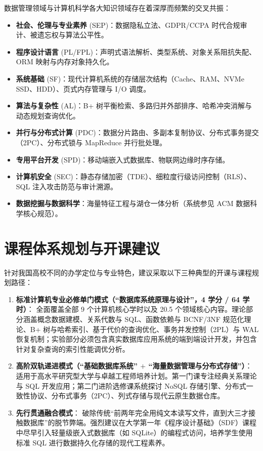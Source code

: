 数据管理领域与计算机科学各大知识领域存在着深厚而频繁的交叉共振：
\begin{itemize}
    \item \textbf{社会、伦理与专业素养} (SEP)：数据隐私立法、GDPR/CCPA 时代合规审计、被遗忘权与算法公平性。
    \item \textbf{程序设计语言} (PL/FPL)：声明式语法解析、类型系统、对象关系阻抗失配、ORM 映射与内存对象持久化。
    \item \textbf{系统基础} (SF)：现代计算机系统的存储层次结构（Cache、RAM、NVMe SSD、HDD）、页式内存管理与 I/O 调度。
    \item \textbf{算法与复杂性} (AL)：B+ 树平衡检索、多路归并外部排序、哈希冲突消解与动态规划查询优化。
    \item \textbf{并行与分布式计算} (PDC)：数据分片路由、多副本复制协议、分布式事务提交（2PC）、分布式锁与 MapReduce 并行批处理。
    \item \textbf{专用平台开发} (SPD)：移动端嵌入式数据库、物联网边缘时序存储。
    \item \textbf{计算机安全} (SEC)：静态存储加密（TDE）、细粒度行级访问控制（RLS）、SQL 注入攻击防范与审计溯源。
    \item \textbf{数据挖掘与数据科学}：海量特征工程与湖仓一体分析（系统参见 ACM 数据科学核心规范）。
\end{itemize}

\section{课程体系规划与开课建议}

针对我国高校不同的办学定位与专业特色，建议采取以下三种典型的开课与课程规划路径：
\begin{enumerate}
    \item \textbf{标准计算机专业必修单门模式（“数据库系统原理与设计”，4 学分 / 64 学时）}：
    全面覆盖全部 9 个计算机核心学时以及 20.5 个领域核心内容。理论部分涵盖概念数据建模、关系代数与 SQL、函数依赖与 BCNF/3NF 规范化理论、B+ 树与哈希索引、基于代价的查询优化、事务并发控制（2PL）与 WAL 恢复机制；实验部分必须包含真实数据库应用系统的端到端设计开发，并包含针对复杂查询的索引性能调优分析。
    \item \textbf{高阶双轨递进模式（“基础数据库系统” $+$ “海量数据管理与分布式存储”）}：
    适用于高水平研究型大学与卓越工程师培养计划。第一门课专注经典关系理论与 SQL 开发应用；第二门进阶选修课系统探讨 NoSQL 存储引擎、分布式一致性协议、分布式事务（2PC）、列式存储与现代云原生数据仓库。
    \item \textbf{先行贯通融合模式}：
    破除传统“前两年完全用纯文本读写文件，直到大三才接触数据库”的脱节弊端。强烈建议在大学第一年《程序设计基础》（SDF）课程中尽早引入轻量级嵌入式数据库（如 SQLite）的编程式访问，培养学生使用标准 SQL 进行数据持久化存储的现代工程素养。
\end{enumerate}


